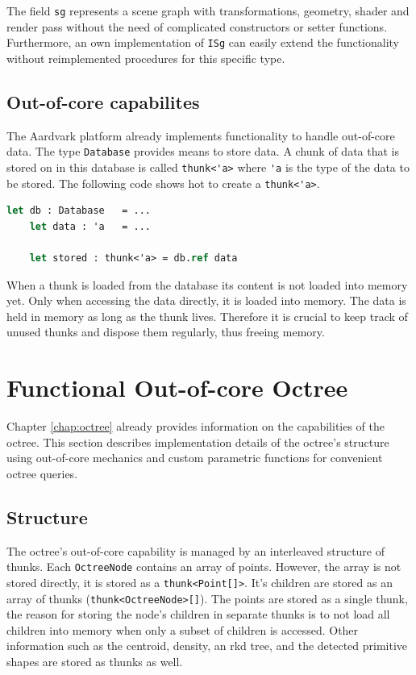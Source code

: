 The field \verb|sg| represents a scene graph with transformations, geometry, shader and render pass without the need of complicated constructors or setter functions. Furthermore, an own implementation of \verb|ISg| can easily extend the functionality without reimplemented procedures for this specific type. 


\subsection{Out-of-core capabilites}
The Aardvark platform already implements functionality to handle out-of-core data. The type \verb|Database| provides means to store data. A chunk of data that is stored on in this database is called \verb|thunk<'a>| where \verb|'a| is the type of the data to be stored. The following code shows hot to create a \verb|thunk<'a>|. 

\begin{lstlisting}[language = FSharp]
	let db : Database	= ...
	let data : 'a 	= ...
	
	let stored : thunk<'a> = db.ref data
\end{lstlisting}
When a thunk is loaded from the database its content is not loaded into memory yet. Only when accessing the data directly, it is loaded into memory. The data is held in memory as long as the thunk lives. Therefore it is crucial to keep track of unused thunks and dispose them regularly, thus freeing memory. 


\section{Functional Out-of-core Octree}

Chapter \ref{chap:octree} already provides information on the capabilities of the octree. This section describes implementation details of the octree's structure using out-of-core mechanics and custom parametric functions for convenient octree queries. 


\subsection{Structure}

The octree's out-of-core capability is managed by an interleaved structure of thunks. Each \verb|OctreeNode| contains an array of points. However, the array is not stored directly, it is stored as a \verb|thunk<Point[]>|. It's children are stored as an array of thunks (\verb|thunk<OctreeNode>[]|). The points are stored as a single thunk, the reason for storing the node's children in separate thunks is to not load all children into memory when only a subset of children is accessed. Other information such as the centroid, density, an rkd tree, and the detected primitive shapes are stored as thunks as well. 


